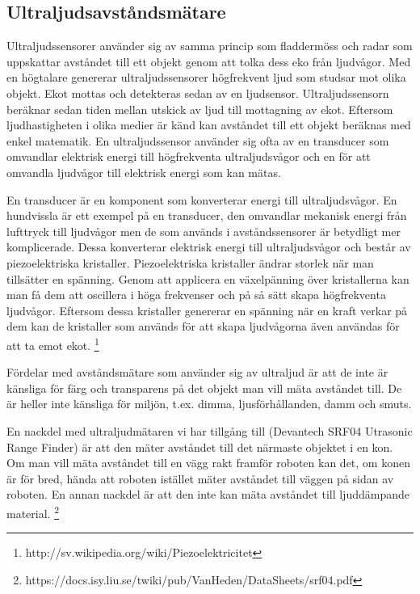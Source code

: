 \documentclass[a4paper,12pt,fleqn]{article}
\begin{document}
\subsection{Ultraljudsavståndsmätare}
Ultraljudssensorer använder sig av samma princip som fladdermöss och radar som uppskattar avståndet till ett objekt genom att tolka dess eko från ljudvågor. Med en högtalare genererar ultraljudssensorer högfrekvent ljud som studsar mot olika objekt. Ekot mottas och detekteras sedan av en ljudsensor. Ultraljudssensorn beräknar sedan tiden mellan utskick av ljud till mottagning av ekot. Eftersom ljudhastigheten i olika medier är känd kan avståndet till ett objekt beräknas med enkel matematik. En ultraljudssensor använder sig ofta av en transducer som omvandlar elektrisk energi till högfrekventa ultraljudsvågor och en för att omvandla ljudvågor till elektrisk energi som kan mätas.

En transducer är en komponent som konverterar energi till ultraljudsvågor. En hundvissla är ett exempel på en transducer, den omvandlar mekanisk energi från lufttryck till ljudvågor men de som används i avståndssensorer är betydligt mer komplicerade. Dessa konverterar elektrisk energi till ultraljudsvågor och består av piezoelektriska kristaller. Piezoelektriska kristaller ändrar storlek när man tillsätter en spänning. Genom att applicera en växelpänning över kristallerna kan man få dem att oscillera i höga frekvenser och på så sätt skapa högfrekventa ljudvågor. Eftersom dessa kristaller genererar en spänning när en kraft verkar på dem kan de kristaller som används för att skapa ljudvågorna även användas för att ta emot ekot.
\footnote{http://sv.wikipedia.org/wiki/Piezoelektricitet}

Fördelar med avståndsmätare som använder sig av ultraljud är att de inte är känsliga för färg och transparens på det objekt man vill mäta avståndet till. De är heller inte känsliga för miljön, t.ex. dimma, ljusförhållanden, damm och smuts.

En nackdel med ultraljudmätaren vi har tillgång till (Devantech SRF04 Utrasonic Range Finder) är att den mäter avståndet till det närmaste objektet i en kon. Om man vill mäta avståndet till en vägg rakt framför roboten kan det, om konen är för bred, hända att roboten istället mäter avståndet till väggen på sidan av roboten. En annan nackdel är att den inte kan mäta avståndet till ljuddämpande material.
\footnote{https://docs.isy.liu.se/twiki/pub/VanHeden/DataSheets/srf04.pdf}
\end{document}
